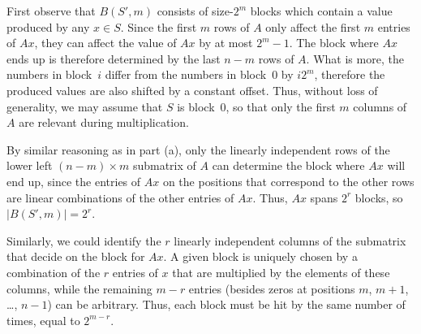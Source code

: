 First observe that $B(S',m)$ consists of size-$2^m$ blocks which contain a value produced by any $x\in S$.
Since the first $m$ rows of $A$ only affect the first $m$ entries of $Ax$, they can affect the value of $Ax$ by at most $2^m-1$.
The block where $Ax$ ends up is therefore determined by the last $n-m$ rows of $A$.
What is more, the numbers in block~$i$ differ from the numbers in block~0 by $i2^m$, therefore the produced values are also shifted by a constant offset.
Thus, without loss of generality, we may assume that $S$ is block~0, so that only the first $m$ columns of $A$ are relevant during multiplication.

By similar reasoning as in part (a), only the linearly independent rows of the lower left $(n-m)\times m$ submatrix of $A$ can determine the block where $Ax$ will end up, since the entries of $Ax$ on the positions that correspond to the other rows are linear combinations of the other entries of $Ax$.
Thus, $Ax$ spans $2^r$ blocks, so $|B(S',m)|=2^r$.

Similarly, we could identify the $r$ linearly independent columns of the submatrix that decide on the block for $Ax$.
A given block is uniquely chosen by a combination of the $r$ entries of $x$ that are multiplied by the elements of these columns, while the remaining $m-r$ entries (besides zeros at positions $m$, $m+1$, \dots, $n-1$) can be arbitrary.
Thus, each block must be hit by the same number of times, equal to $2^{m-r}$.
